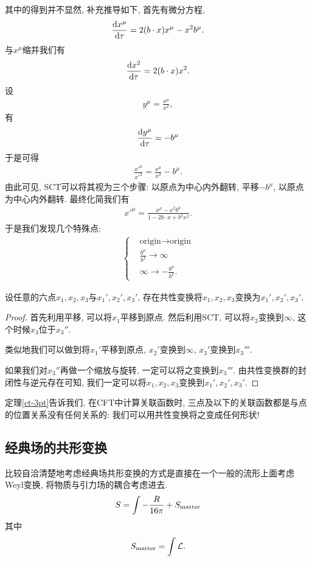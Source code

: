 其中的得到并不显然, 补充推导如下, 首先有微分方程, 
\begin{align}
    \de{x^\mu}{\tau}=2(b\cdot x)x^\mu-x^2b^\mu.
\end{align}
与$x^\mu$缩并我们有
\begin{align}
    \de{x^2}{\tau}=2(b\cdot x)x^2.
\end{align}
设
\begin{align}
    y^\mu=\frac{x^\mu}{x^2}, 
\end{align}
有
\begin{align}
    \de{y^\mu}{\tau}=-b^\mu
\end{align}
于是可得
\begin{align}
    \frac{x'^\mu}{x'^2}=\frac{x^\mu}{x^2}-b^\mu.
\end{align}
由此可见, SCT可以将其视为三个步骤: 以原点为中心内外翻转, 平移$-b^\mu$, 以原点为中心内外翻转. 最终化简我们有
\begin{align}
    x'^\mu=\frac{x^\mu-x^2b^\mu}{1-2b\cdot x+b^2 x^2}.
\end{align}
于是我们发现几个特殊点:
\begin{align}
    \begin{cases}
        & \text{origin}\to\text{origin}\\
        & \frac{b^\mu}{b^2}\to\infty\\
        & \infty\to-\frac{b^\mu}{b^2}.
    \end{cases}
\end{align}

\begin{theorem}\label{ct-3pt}
    设任意的六点$x_1, x_2, x_3$与$x_1', x_2', x_3'$, 存在共性变换将$x_1, x_2, x_3$变换为$x_1', x_2', x_3'$.
\end{theorem}
\begin{proof}
    首先利用平移, 可以将$x_1$平移到原点. 然后利用SCT, 可以将$x_2$变换到$\infty$, 这个时候$x_3$位于$x_3''$.
    
    类似地我们可以做到将$x_1'$平移到原点, $x_2'$变换到$\infty$, $x_3'$变换到$x_3'''$.

    如果我们对$x_3''$再做一个缩放与旋转, 一定可以将之变换到$x_3'''$. 由共性变换群的封闭性与逆元存在可知, 我们一定可以将$x_1, x_2, x_3$变换到$x_1', x_2', x_3'$.
\end{proof}

定理\ref{ct-3pt}告诉我们, 在CFT中计算关联函数时, 三点及以下的关联函数都是与点的位置关系没有任何关系的: 我们可以用共性变换将之变成任何形状!

\subsection{经典场的共形变换}
比较自洽清楚地考虑经典场共形变换的方式是直接在一个一般的流形上面考虑Weyl变换, 将物质与引力场的耦合考虑进去.
\begin{align}
    S=\int-\frac{R}{16\pi}+S_{\rm{matter}}
\end{align}
其中
\begin{align}
    S_{\rm{matter}}=\int\mathcal L.
\end{align}

